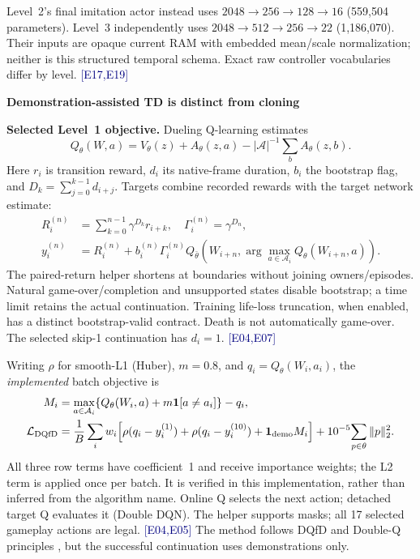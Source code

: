 \documentclass[11pt,a4paper]{article}
\newcommand{\topic}[2]{\vspace*{-4mm}{\small\color{teal}\textbf{#1}}\par{\LARGE\bfseries #2}\par\vspace{3mm}}
\newcommand{\ev}[1]{{\small\textcolor{navy}{[#1]}}}
\begin{document}
Level~2's final imitation actor instead uses $2048\to256\to128\to16$ (559,504 parameters). Level~3 independently uses $2048\to512\to256\to22$ (1,186,070). Their inputs are opaque current RAM with embedded mean/scale normalization; neither is this structured temporal schema. Exact raw controller vocabularies differ by level. \ev{E17,E19}

\newpage
\topic{04 / LEARNING OBJECTIVES}{Demonstration-assisted TD is distinct from cloning}
\textbf{Selected Level~1 objective.} Dueling Q-learning estimates
\[Q_\theta(W,a)=V_\theta(z)+A_\theta(z,a)-|\mathcal A|^{-1}\sum_b A_\theta(z,b).\]
Here $r_i$ is transition reward, $d_i$ its native-frame duration, $b_i$ the bootstrap flag, and $D_k=\sum_{j=0}^{k-1}d_{i+j}$. Targets combine recorded rewards with the target network estimate:
\begin{align}
 R_i^{(n)}&=\sum_{k=0}^{n-1}\gamma^{D_k}r_{i+k},\quad \Gamma_i^{(n)}=\gamma^{D_n},\label{eq:return}\\
 y_i^{(n)}&=R_i^{(n)}+b_i^{(n)}\Gamma_i^{(n)}
 Q_{\bar\theta}\!\left(W_{i+n},\arg\max_{a\in\mathcal A_i}Q_\theta(W_{i+n},a)\right).\label{eq:target}
\end{align}
The paired-return helper shortens at boundaries without joining owners/episodes. Natural game-over/completion and unsupported states disable bootstrap; a time limit retains the actual continuation. Training life-loss truncation, when enabled, has a distinct bootstrap-valid contract. Death is not automatically game-over. The selected skip-1 continuation has $d_i=1$. \ev{E04,E07}

Writing $\rho$ for smooth-L1 (Huber), $m=0.8$, and $q_i=Q_\theta(W_i,a_i)$, the \emph{implemented} batch objective is
\begin{align}
 M_i&=\max_{a\in\mathcal A_i}\{Q_\theta(W_i,a)+m\mathbf1[a\ne a_i]\}-q_i,\\
 \mathcal L_{\rm DQfD}&=\frac1B\sum_i w_i\!\left[\rho(q_i-y_i^{(1)})+\rho(q_i-y_i^{(10)})+
 \mathbf1_{\rm demo}M_i\right]+10^{-5}\!\sum_{p\in\theta}\|p\|_2^2.\label{eq:dqfd}
\end{align}
All three row terms have coefficient~1 and receive importance weights; the L2 term is applied once per batch. It is verified in this implementation, rather than inferred from the algorithm name. Online Q selects the next action; detached target Q evaluates it (Double DQN). The helper supports masks; all 17 selected gameplay actions are legal. \ev{E04,E05} The method follows DQfD and Double-Q principles \cite{dqfd,doubleq}, but the successful continuation uses demonstrations only.
\end{document}
